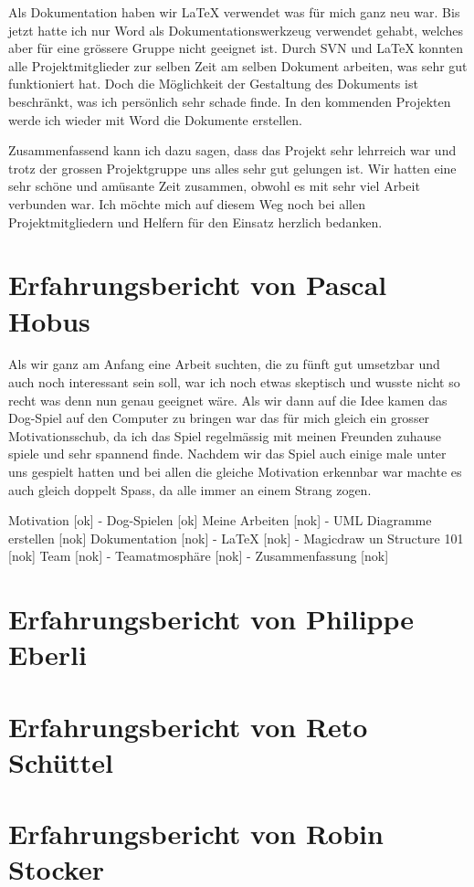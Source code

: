\documentclass[12pt,halfparskip]{scrartcl}
\begin{document}
Als Dokumentation haben wir LaTeX verwendet was für mich ganz neu war. Bis jetzt hatte ich nur Word als Dokumentationswerkzeug verwendet gehabt, welches aber für eine grössere Gruppe nicht geeignet ist. Durch SVN und LaTeX konnten alle Projektmitglieder zur selben Zeit am selben Dokument arbeiten, was sehr gut funktioniert hat. Doch die Möglichkeit der Gestaltung des Dokuments ist beschränkt, was ich persönlich sehr schade finde. In den kommenden Projekten werde ich wieder mit Word die Dokumente erstellen.

Zusammenfassend kann ich dazu sagen, dass das Projekt sehr lehrreich war und trotz der grossen Projektgruppe uns alles sehr gut gelungen ist. Wir hatten eine sehr schöne und amüsante Zeit zusammen, obwohl es mit sehr viel Arbeit verbunden war. Ich möchte mich auf diesem Weg noch bei allen Projektmitgliedern und Helfern für den Einsatz herzlich bedanken.


\section{Erfahrungsbericht von Pascal Hobus}

Als wir ganz am Anfang eine Arbeit suchten, die zu fünft gut umsetzbar und auch noch interessant sein soll, war ich noch etwas skeptisch und wusste nicht so recht was denn nun genau geeignet wäre. Als wir dann auf die Idee kamen das Dog-Spiel auf den Computer zu bringen war das für mich gleich ein grosser Motivationsschub, da ich das Spiel regelmässig mit meinen Freunden zuhause spiele und sehr spannend finde. Nachdem wir das Spiel auch einige male unter uns gespielt hatten und bei allen die gleiche Motivation erkennbar war machte es auch gleich doppelt Spass, da alle immer an einem Strang zogen.


Motivation						[ok]
- Dog-Spielen					[ok]
Meine Arbeiten					[nok]
- UML Diagramme erstellen		[nok]
Dokumentation					[nok]
- LaTeX							[nok]
- Magicdraw un Structure 101	[nok]
Team							[nok]
- Teamatmosphäre				[nok]
- Zusammenfassung				[nok]

\section{Erfahrungsbericht von Philippe Eberli}

\section{Erfahrungsbericht von Reto Schüttel}

\section{Erfahrungsbericht von Robin Stocker}
\end{document}
